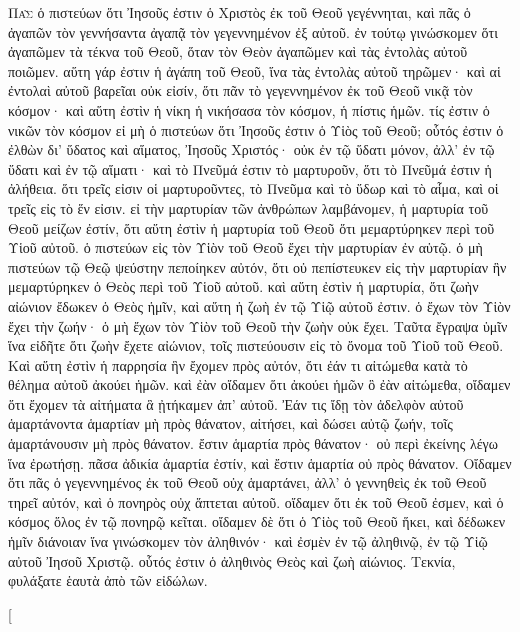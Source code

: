 \begin{pages}
    \begin{Rightside}
        \beginnumbering
		\renewcommand{\LettrineFontHook}{\PHtitl}
		\lettrine[lines=3]{Π}{ᾶς} ὁ πιστεύων ὅτι Ἰησοῦς ἐστιν ὁ Χριστὸς ἐκ τοῦ Θεοῦ γεγέννηται, καὶ πᾶς ὁ ἀγαπῶν τὸν γεννήσαντα ἀγαπᾷ τὸν γεγεννημένον ἐξ αὐτοῦ. ἐν τούτῳ γινώσκομεν ὅτι ἀγαπῶμεν τὰ τέκνα τοῦ Θεοῦ, ὅταν τὸν Θεὸν ἀγαπῶμεν καὶ τὰς ἐντολὰς αὐτοῦ ποιῶμεν. αὕτη γάρ ἐστιν ἡ ἀγάπη τοῦ Θεοῦ, ἵνα τὰς ἐντολὰς αὐτοῦ τηρῶμεν· καὶ αἱ ἐντολαὶ αὐτοῦ βαρεῖαι οὐκ εἰσίν, ὅτι πᾶν τὸ γεγεννημένον ἐκ τοῦ Θεοῦ νικᾷ τὸν κόσμον· καὶ αὕτη ἐστὶν ἡ νίκη ἡ νικήσασα τὸν κόσμον, ἡ πίστις ἡμῶν. τίς ἐστιν ὁ νικῶν τὸν κόσμον εἰ μὴ ὁ πιστεύων ὅτι Ἰησοῦς ἐστιν ὁ Υἱὸς τοῦ Θεοῦ; οὗτός ἐστιν ὁ ἐλθὼν δι’ ὕδατος καὶ αἵματος, Ἰησοῦς Χριστός· οὐκ ἐν τῷ ὕδατι μόνον, ἀλλ’ ἐν τῷ ὕδατι καὶ ἐν τῷ αἵματι· καὶ τὸ Πνεῦμά ἐστιν τὸ μαρτυροῦν, ὅτι τὸ Πνεῦμά ἐστιν ἡ ἀλήθεια. ὅτι τρεῖς εἰσιν οἱ μαρτυροῦντες, τὸ Πνεῦμα καὶ τὸ ὕδωρ καὶ τὸ αἷμα, καὶ οἱ τρεῖς εἰς τὸ ἕν εἰσιν. εἰ τὴν μαρτυρίαν τῶν ἀνθρώπων λαμβάνομεν, ἡ μαρτυρία τοῦ Θεοῦ μείζων ἐστίν, ὅτι αὕτη ἐστὶν ἡ μαρτυρία τοῦ Θεοῦ ὅτι μεμαρτύρηκεν περὶ τοῦ Υἱοῦ αὐτοῦ. ὁ πιστεύων εἰς τὸν Υἱὸν τοῦ Θεοῦ ἔχει τὴν μαρτυρίαν ἐν αὑτῷ. ὁ μὴ πιστεύων τῷ Θεῷ ψεύστην πεποίηκεν αὐτόν, ὅτι οὐ πεπίστευκεν εἰς τὴν μαρτυρίαν ἣν μεμαρτύρηκεν ὁ Θεὸς περὶ τοῦ Υἱοῦ αὐτοῦ. καὶ αὕτη ἐστὶν ἡ μαρτυρία, ὅτι ζωὴν αἰώνιον ἔδωκεν ὁ Θεὸς ἡμῖν, καὶ αὕτη ἡ ζωὴ ἐν τῷ Υἱῷ αὐτοῦ ἐστιν. ὁ ἔχων τὸν Υἱὸν ἔχει τὴν ζωήν· ὁ μὴ ἔχων τὸν Υἱὸν τοῦ Θεοῦ τὴν ζωὴν οὐκ ἔχει. Ταῦτα ἔγραψα ὑμῖν ἵνα εἰδῆτε ὅτι ζωὴν ἔχετε αἰώνιον, τοῖς πιστεύουσιν εἰς τὸ ὄνομα τοῦ Υἱοῦ τοῦ Θεοῦ. Καὶ αὕτη ἐστὶν ἡ παρρησία ἣν ἔχομεν πρὸς αὐτόν, ὅτι ἐάν τι αἰτώμεθα κατὰ τὸ θέλημα αὐτοῦ ἀκούει ἡμῶν. καὶ ἐὰν οἴδαμεν ὅτι ἀκούει ἡμῶν ὃ ἐὰν αἰτώμεθα, οἴδαμεν ὅτι ἔχομεν τὰ αἰτήματα ἃ ᾐτήκαμεν ἀπ’ αὐτοῦ. Ἐάν τις ἴδῃ τὸν ἀδελφὸν αὐτοῦ ἁμαρτάνοντα ἁμαρτίαν μὴ πρὸς θάνατον, αἰτήσει, καὶ δώσει αὐτῷ ζωήν, τοῖς ἁμαρτάνουσιν μὴ πρὸς θάνατον. ἔστιν ἁμαρτία πρὸς θάνατον· οὐ περὶ ἐκείνης λέγω ἵνα ἐρωτήσῃ. πᾶσα ἀδικία ἁμαρτία ἐστίν, καὶ ἔστιν ἁμαρτία οὐ πρὸς θάνατον. Οἴδαμεν ὅτι πᾶς ὁ γεγεννημένος ἐκ τοῦ Θεοῦ οὐχ ἁμαρτάνει, ἀλλ’ ὁ γεννηθεὶς ἐκ τοῦ Θεοῦ τηρεῖ αὐτόν, καὶ ὁ πονηρὸς οὐχ ἅπτεται αὐτοῦ. οἴδαμεν ὅτι ἐκ τοῦ Θεοῦ ἐσμεν, καὶ ὁ κόσμος ὅλος ἐν τῷ πονηρῷ κεῖται. οἴδαμεν δὲ ὅτι ὁ Υἱὸς τοῦ Θεοῦ ἥκει, καὶ δέδωκεν ἡμῖν διάνοιαν ἵνα γινώσκομεν τὸν ἀληθινόν· καὶ ἐσμὲν ἐν τῷ ἀληθινῷ, ἐν τῷ Υἱῷ αὐτοῦ Ἰησοῦ Χριστῷ. οὗτός ἐστιν ὁ ἀληθινὸς Θεὸς καὶ ζωὴ αἰώνιος. Τεκνία, φυλάξατε ἑαυτὰ ἀπὸ τῶν εἰδώλων.
		\pend
        \endnumbering
    \end{Rightside}
    \begin{Leftside}
        \beginnumbering
        \pstart[

\end{Leftside}
\end{pages}
